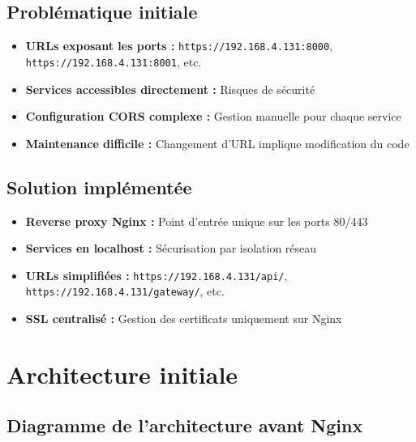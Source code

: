\documentclass[12pt,a4paper]{article}
\begin{document}
\subsection{Problématique initiale}

\begin{itemize}[leftmargin=*]
    \item \textbf{URLs exposant les ports :} \texttt{https://192.168.4.131:8000}, \texttt{https://192.168.4.131:8001}, etc.
    \item \textbf{Services accessibles directement :} Risques de sécurité
    \item \textbf{Configuration CORS complexe :} Gestion manuelle pour chaque service
    \item \textbf{Maintenance difficile :} Changement d'URL implique modification du code
\end{itemize}

\subsection{Solution implémentée}

\begin{itemize}[leftmargin=*]
    \item \textbf{Reverse proxy Nginx :} Point d'entrée unique sur les ports 80/443
    \item \textbf{Services en localhost :} Sécurisation par isolation réseau
    \item \textbf{URLs simplifiées :} \texttt{https://192.168.4.131/api/}, \texttt{https://192.168.4.131/gateway/}, etc.
    \item \textbf{SSL centralisé :} Gestion des certificats uniquement sur Nginx
\end{itemize}


\section{Architecture initiale}

\subsection{Diagramme de l'architecture avant Nginx}
\end{document}
